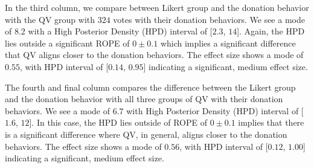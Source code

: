 In the third column, we compare between Likert group
and the donation behavior with the QV group with $324$ votes
with their donation behaviors. We see a mode of $8.2$
with a High Posterior Density (HPD) interval of [$2.3$, $14$].
Again, the HPD lies outside a significant ROPE of $0 \pm 0.1$
which implies a significant difference that
QV aligns closer to the donation behaviors.
The effect size shows a mode of $0.55$, 
with HPD interval of [$0.14$, $0.95$] 
indicating a significant, medium effect size.

The fourth and final column 
compares the difference between the Likert group
and the donation behavior with all three groups of QV
with their donation behaviors. We see a mode of $6.7$
with High Posterior Density (HPD) interval of [$1.6$, $12$].
In this case, the HPD lies outside of ROPE of $0 \pm 0.1$
implies that there is a significant difference where
QV, in general, aligns closer to the donation behaviors.
The effect size shows a mode of $0.56$, 
with HPD interval of [$0.12$, $1.00$] 
indicating a significant, medium effect size.



